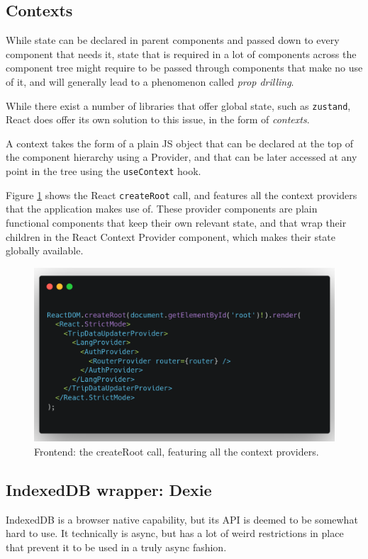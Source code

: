 \subsection{Contexts}
While state can be declared in parent components and passed down to every component that needs it, state that is required in a lot of components across the component tree might require to be passed through components that make no use of it, and will generally lead to a phenomenon called \textit{prop drilling}.

While there exist a number of libraries that offer global state, such as \verb|zustand|, React does offer its own solution to this issue, in the form of \textit{contexts}.

A context takes the form of a plain JS object that can be declared at the top of the component hierarchy using a Provider, and that can be later accessed at any point in the tree using the \verb|useContext| hook.

Figure \ref{FigFeContexts} shows the React \verb|createRoot| call, and features all the context provi\-ders that the application makes use of. These provider components are plain functional components that keep their own relevant state, and that wrap their children in the React Context Provider component, which makes their state globally available.

\begin{figure}[htbp]
    \centering
    \includegraphics[width=.8\textwidth]{./figures/code/fe_contexts.png}
    \caption{Frontend: the createRoot call, featuring all the context providers.}
    \label{FigFeContexts}
\end{figure}

\subsection{IndexedDB wrapper: Dexie}
IndexedDB is a browser native capability, but its API is deemed to be somewhat hard to use. It technically is async, but has a lot of weird restrictions in place that prevent it to be used in a truly async fashion.


